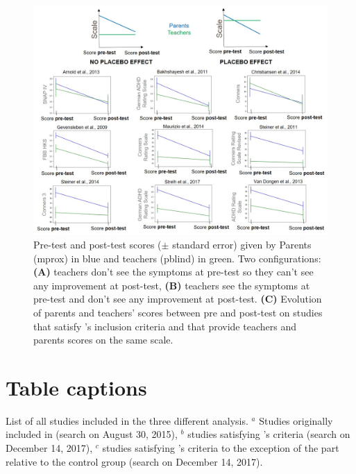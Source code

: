 \documentclass[12pt,a4paper,english]{article}
\begin{document}
\begin{figure}[h!]
  \centering
  \includegraphics[width=1.0\linewidth]{figures/discussion_on_placebo_effect_colors_2-columns_fitting_image.jpg}
  \caption{Pre-test and post-test scores ($\pm$ standard error) given by Parents (\gls{mprox}) in blue and teachers (\gls{pblind}) in green. Two configurations: \textbf{(A)} teachers don’t see the symptoms at 
	pre-test so they can’t see any improvement at post-test, \textbf{(B)} teachers see the symptoms at pre-test and don’t see any improvement at post-test. \textbf{(C)} Evolution of parents and teachers' scores
	between pre and post-test on studies that satisfy \citeauthor{Cortese2016}'s inclusion criteria and that provide teachers and parents scores on the same scale.}
  \label{Figure:discussion_on_placebo_effect_colors_2-columns_fitting_image}
\end{figure} 

\clearpage

\section*{Table captions}

\begin{table}[h!]
  \centering
  \caption{List of all studies included in the three different analysis. $^a$ Studies originally included in \citet{Cortese2016}
	(search on August 30, 2015), $^b$ studies satisfying \citet{Cortese2016}'s criteria (search on December 14, 2017), $^c$ studies 
	satisfying \citet{Cortese2016}'s criteria to the exception of the part relative to the control group (search on December 14, 2017).}
  
  \label{Table:table_factors_analysis_meta_analysis_list_studies}
\end{table}
\end{document}
